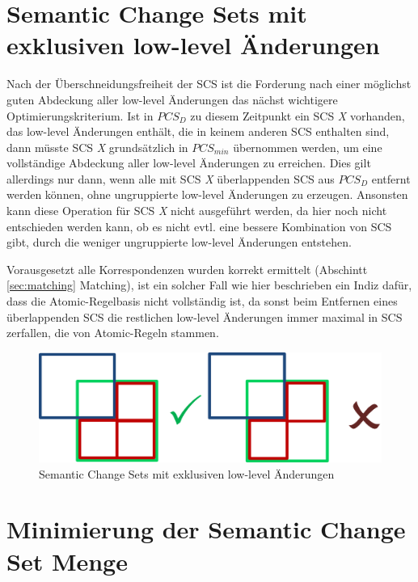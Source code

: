 \section{Semantic Change Sets mit exklusiven low-level Änderungen}

Nach der Überschneidungsfreiheit der SCS ist die Forderung nach einer möglichst guten Abdeckung
aller low-level Änderungen das nächst wichtigere Optimierungskriterium. Ist in $PCS_D$ zu diesem
Zeitpunkt ein SCS \textit{X} vorhanden, das low-level Änderungen enthält, die in keinem anderen SCS
enthalten sind, dann müsste SCS \textit{X} grundsätzlich in $PCS_{min}$ übernommen werden, um eine
vollständige Abdeckung aller low-level Änderungen zu erreichen. Dies gilt allerdings nur dann, wenn
alle mit SCS \textit{X} überlappenden SCS aus $PCS_D$ entfernt werden können, ohne ungruppierte
low-level Änderungen zu erzeugen. Ansonsten kann diese Operation für SCS \textit{X} nicht ausgeführt
werden, da hier noch nicht entschieden werden kann, ob es nicht evtl. eine bessere Kombination von
SCS gibt, durch die weniger ungruppierte low-level Änderungen entstehen. 

Vorausgesetzt alle Korrespondenzen wurden korrekt ermittelt (Abschintt \ref{sec:matching} Matching),
ist ein solcher Fall wie hier beschrieben ein Indiz dafür, dass die Atomic-Regelbasis nicht
vollständig ist, da sonst beim Entfernen eines überlappenden SCS die restlichen low-level Änderungen
immer maximal in SCS zerfallen, die von Atomic-Regeln stammen.

\begin{figure}[htb]
  \centering
  \includegraphics[scale=0.5]{images/post_processing_exclusive.png}
  \caption{Semantic Change Sets mit exklusiven low-level Änderungen}
  \label{fig:post_processing_exclusive}
\end{figure}

\section{Minimierung der Semantic Change Set Menge}

